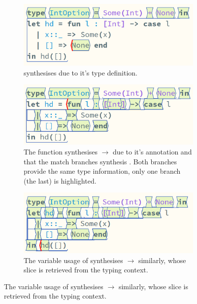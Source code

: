 \begin{figure}[h]
\centering
\begin{subfigure}[t]{0.45\textwidth}
\centering
\includegraphics[width=1\textwidth]{Media/Figures/none_syn}
\caption{ synthesises  due to it's type definition.}
\end{subfigure}
\begin{subfigure}[t]{0.45\textwidth}
\centering
\includegraphics[width=1\textwidth]{Media/Figures/fun_syn}
\caption{The function synthesises \code{[Int]}$\to$  due to it's \code{[Int]} annotation and that the match branches synthesis . Both branches provide the same type information, only one branch (the last) is highlighted.}
\end{subfigure}
\begin{subfigure}[t]{0.45\textwidth}
\centering
\includegraphics[width=1\textwidth]{Media/Figures/hd_syn}
\caption{The variable usage of  synthesises \code{[Int]}$\to$  similarly, whose slice is retrieved from the typing context.}
\end{subfigure}

\end{figure}
